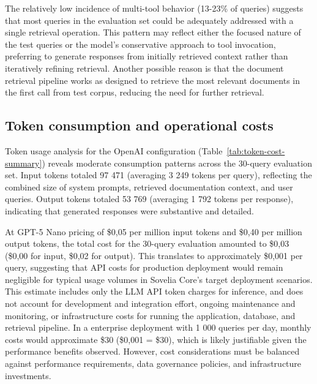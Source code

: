 The relatively low incidence of multi-tool behavior (13-23\% of queries) suggests that most queries in the evaluation set could be adequately addressed with a single retrieval operation. This pattern may reflect either the focused nature of the test queries or the model's conservative approach to tool invocation, preferring to generate responses from initially retrieved context rather than iteratively refining retrieval. Another possible reason is  that the document retrieval pipeline works as designed to retrieve the most relevant documents in the first call from test corpus, reducing the need for further retrieval.

\subsection{Token consumption and operational costs}
\label{subsec:token-costs}

Token usage analysis for the OpenAI configuration (Table~\ref{tab:token-cost-summary}) reveals moderate consumption patterns across the 30-query evaluation set. Input tokens totaled 97 471 (averaging 3 249 tokens per query), reflecting the combined size of system prompts, retrieved documentation context, and user queries. Output tokens totaled 53 769 (averaging 1 792 tokens per response), indicating that generated responses were substantive and detailed.

At GPT-5 Nano pricing of \$0,05 per million input tokens and \$0,40 per million output tokens, the total cost for the 30-query evaluation amounted to \$0,03 (\$0,00 for input, \$0,02 for output). This translates to approximately \$0,001 per query, suggesting that API costs for production deployment would remain negligible for typical usage volumes in Sovelia Core's target deployment scenarios. This estimate includes only the LLM API token charges for inference, and does not account for development and integration effort, ongoing maintenance and monitoring, or infrastructure costs for running the application, database, and retrieval pipeline. In a enterprise deployment with 1 000 queries per day, monthly costs would approximate \$30 (\$0,001   = \$30), which is likely justifiable given the performance benefits observed. However, cost considerations must be balanced against performance requirements, data governance policies, and infrastructure investments.


